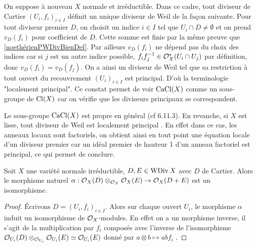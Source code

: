 On suppose à nouveau $X$ normale et irréductible. Dans ce cadre, tout diviseur de Cartier $(U_i, f_i)_{i\in I}$ définit un unique diviseur de Weil de la façon suivante. Pour tout diviseur premier $D$, on choisit un indice $i\in I$ tel que $U_i\cap D\neq \emptyset$ et on prend $v_D(f_i)$ pour coefficient de $D$. Cette somme est finie par la même preuve que \ref{noethérienPWDivBienDef}. Par ailleurs $v_D(f_i)$ ne dépend pas du choix des indices car si $j$ est un autre indice possible, $f_if_j^{-1}\in \mathcal{O}_X^*(U_i\cap U_j)$ par définition, donc $v_D(f_i)=v_D(f_j)$. On a ainsi un diviseur de Weil tel que sa restriction à tout ouvert du recouvrement $(U_i)_{i\in I}$ est principal. D'où la terminologie "localement principal". Ce constat permet de voir $\operatorname{CaCl}(X)$ comme un sous-groupe de $\operatorname{Cl}(X)$ car on vérifie que les diviseurs principaux se correspondent.

Le sous-groupe $\operatorname{CaCl}(X)$ est propre en général (cf \cite{Hartshorne} 6.11.3). En revanche, si $X$ est lisse, tout diviseur de Weil est localement principal . En effet dans ce cas, les anneaux locaux sont factoriels, on obtient ainsi en tout point une équation locale d'un diviseur premier car un idéal premier de hauteur 1 d'un anneau factoriel est principal, ce qui permet de conclure.

\begin{prop}\label{isomophismeOTimes}
Soit $X$ une variété normale irréductible, $D,E\in\operatorname{WDiv} X$ avec $D$ de Cartier. Alors le morphisme naturel $\alpha:\mathcal{O}_X(D)\otimes_{\mathcal{O}_X}\mathcal{O}_X(E)\rightarrow \mathcal{O}_X(D+E)$ est un isomorphisme.
\end{prop}
\begin{proof}
Écrivons $D=(U_i,f_i)_{i\in I}$. Alors sur chaque ouvert $U_i$, le morphisme $\alpha$ induit un isomorphisme de $\mathcal{O}_X$-modules. En effet on a un morphisme inverse, il s'agit de la multiplication par $f_i$ composée avec l'inverse de l'isomorphisme $\mathcal{O}_{U_i}(D)\otimes_{\mathcal{O}_{U_i}}\mathcal{O}_{U_i}(E) \simeq \mathcal{O}_{U_i}(E)$ donné par $a\otimes b\mapsto abf_i$ .
\end{proof}

